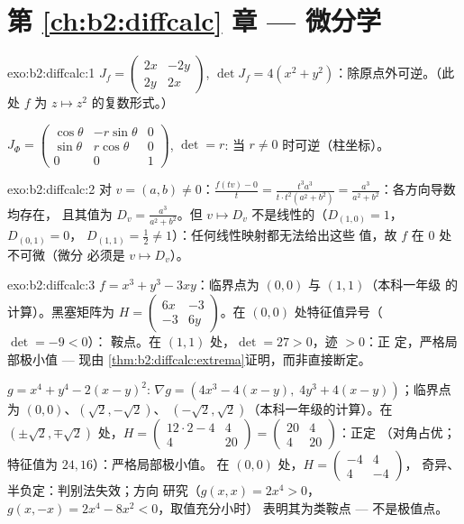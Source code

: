 \section*{第 \ref{ch:b2:diffcalc} 章 --- 微分学}

\begin{solution}{exo:b2:diffcalc:1}
$J_f = \begin{pmatrix} 2x & -2y\\ 2y & 2x\end{pmatrix}$, $\det J_f
= 4(x^2 + y^2)$：除原点外可逆。（此处 $f$ 为 $z
\mapsto z^2$ 的复数形式。）

$J_\Phi = \begin{pmatrix} \cos\theta & -r\sin\theta & 0\\
\sin\theta & r\cos\theta & 0\\ 0 & 0 & 1\end{pmatrix}$, $\det = r$:
当 $r \neq 0$ 时可逆（柱坐标）。
\end{solution}

\begin{solution}{exo:b2:diffcalc:2}
对 $v = (a, b) \neq 0$：$\frac{f(tv) - 0}{t} = \frac{t^3a^3}{t\cdot
t^2(a^2+b^2)} = \frac{a^3}{a^2 + b^2}$：各方向导数均存在，
且其值为 $D_v = \frac{a^3}{a^2+b^2}$。但 $v
\mapsto D_v$ 不是线性的（$D_{(1,0)} = 1$，$D_{(0,1)} = 0$，
$D_{(1,1)} = \frac12 \neq 1$）：任何线性映射都无法给出这些
值，故 $f$ 在 $0$ 处不可微（微分
必须是 $v \mapsto D_v$）。
\end{solution}

\begin{solution}{exo:b2:diffcalc:3}
$f = x^3 + y^3 - 3xy$：临界点为 $(0,0)$ 与 $(1,1)$（本科一年级
的计算）。黑塞矩阵为 $H = \begin{pmatrix} 6x & -3\\ -3 &
6y\end{pmatrix}$。在 $(0,0)$ 处特征值异号（$\det = -9 < 0$）：
鞍点。在 $(1,1)$ 处，$\det = 27 > 0$，迹 $> 0$：正
定，严格局部极小值 --- 现由
\cref{thm:b2:diffcalc:extrema}证明，而非直接断定。

$g = x^4 + y^4 - 2(x-y)^2$: $\nabla g = (4x^3 - 4(x - y),\; 4y^3 +
4(x-y))$；临界点为 $(0,0)$、$(\sqrt2, -\sqrt2)$、
$(-\sqrt2, \sqrt2)$（本科一年级的计算）。在 $(\pm\sqrt2, \mp\sqrt2)$ 处，$H =
\begin{pmatrix} 12\cdot2 - 4 & 4\\ 4 & 20\end{pmatrix} =
\begin{pmatrix} 20 & 4\\ 4 & 20\end{pmatrix}$：正定
（对角占优；特征值为 $24, 16$）：严格局部极小值。
在 $(0,0)$ 处，$H = \begin{pmatrix} -4 & 4\\ 4 & -4\end{pmatrix}$，
奇异、半负定：判别法失效；方向
研究（$g(x,x) = 2x^4 > 0$，$g(x,-x) = 2x^4 - 8x^2 < 0$，取值充分小时）
表明其为类鞍点 --- 不是极值点。
\end{solution}

